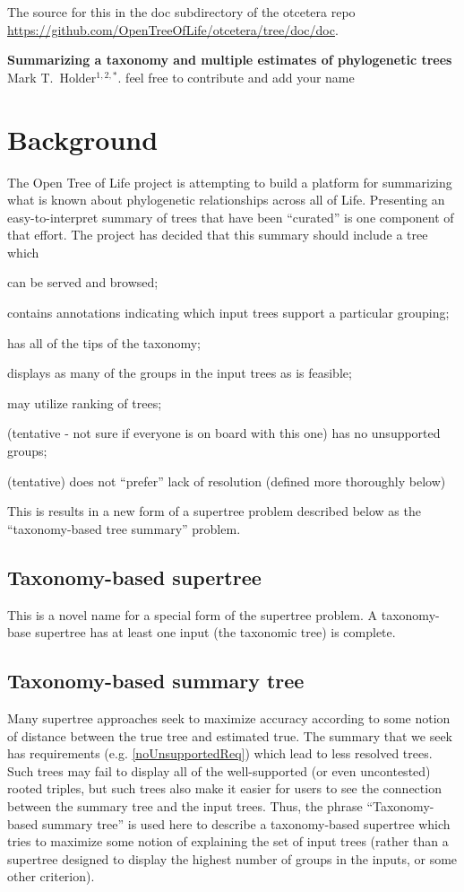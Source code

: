 \documentclass[11pt]{article}
\newcommand{\otol}{Open Tree of Life\xspace}
\begin{document}
The source for this in the doc subdirectory of the otcetera
    repo \url{https://github.com/OpenTreeOfLife/otcetera/tree/doc/doc}.
\begin{center}
    {\bf Summarizing a taxonomy and multiple estimates of phylogenetic trees} \\
{Mark T.~Holder$^{1,2,\ast}$. feel free to contribute and add your name}
\end{center}
\section{Background}
The \otol project is attempting to build a platform for summarizing what is known
    about phylogenetic relationships across all of Life.
Presenting an easy-to-interpret summary of trees that have been ``curated''
    is one component of that effort.
The project has decided that this summary should include a tree which
\begin{compactenum}
    \item can be served and browsed;
    \item contains annotations indicating which input trees support a particular grouping;
    \item has all of the tips of the taxonomy;
    \item displays as many of the groups in the input trees as is feasible;
    \item may utilize ranking of trees;
    \item (tentative - not sure if everyone is on board with this one) has no unsupported groups;\label{noUnsupportedReq}
    \item (tentative) does not ``prefer'' lack of resolution (defined more thoroughly below)
\end{compactenum}
This is results in a new form of a supertree problem described below as the ``taxonomy-based tree summary'' problem.
\subsection{Taxonomy-based supertree}
This is a novel name for a special form of the supertree problem.
A taxonomy-base supertree has at least one input (the taxonomic tree) is complete.
\subsection{Taxonomy-based summary tree}
Many supertree approaches seek to maximize accuracy according to some notion
    of distance between the true tree and estimated true.
The summary that we seek has requirements (e.g. \ref{noUnsupportedReq})
    which lead to less resolved trees.
Such trees may fail to display all of the well-supported (or even uncontested)
    rooted triples, but such trees also make it easier for users to see the
    connection between the summary tree and the input trees.
Thus, the phrase ``Taxonomy-based summary tree'' is used here to describe a
    taxonomy-based supertree which tries to maximize some notion of
    explaining the set of input trees (rather than a supertree designed to
    display the highest number of groups in the inputs, or some other criterion).
\end{document}
